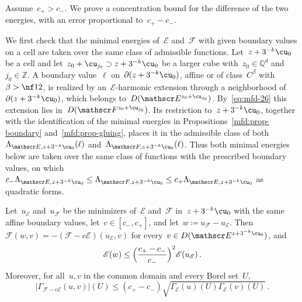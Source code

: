 \documentclass[11pt]{amsart}
\begin{document}
Assume~$c_+>c_-$. We prove a concentration bound for the difference of the two energies, with an error proportional to~$c_+-c_-$.

\smallskip

We first check that the minimal energies of~$\mathscr E$ and~$\mathscr F$ with given boundary values on a cell are taken over the same class of admissible functions. Let~$z+3^{-k}\cu_0$ be a cell and let~$z_0+\cu_{j_0}\supset z+3^{-k}\cu_0$ be a larger cube with~$z_0\in\mathbb Q^d$ and~$j_0\in\mathbb Z$. A boundary value~$\ell$ on~$\partial(z+3^{-k}\cu_0)$, affine or of class~$C^\beta$ with~$\beta>\nf12$, is realized by an~$\mathscr E$-harmonic extension through a neighborhood of~$\partial(z+3^{-k}\cu_0)$, which belongs to~$D(\mathscr E^{z_0+\cu_{j_0}})$. By~\eqref{eq:mfd-26} this extension lies in~$D(\mathscr F^{z_0+\cu_{j_0}})$. Its restriction to~$z+3^{-k}\cu_0$, together with the identification of the minimal energies in Propositions~\ref{mfd:prop-boundary} and~\ref{mfd:prop-gluing}, places it in the admissible class of both~$\Lambda_{\mathscr E,z+3^{-k}\cu_0}(\ell)$ and~$\Lambda_{\mathscr F,z+3^{-k}\cu_0}(\ell)$. Thus both minimal energies below are taken over the same class of functions with the prescribed boundary values, on which~$c_-\Lambda_{\mathscr E,z+3^{-k}\cu_0}\leq\Lambda_{\mathscr F,z+3^{-k}\cu_0}\leq c_+\Lambda_{\mathscr E,z+3^{-k}\cu_0}$ as quadratic forms.

\begin{lemma}
\label{mfd:lem-diff}
Let~$u_{\mathscr E}$ and~$u_{\mathscr F}$ be the minimizers of~$\mathscr E$ and~$\mathscr F$ in~$z+3^{-k}\cu_0$ with the same affine boundary values, let~$c\in[c_-,c_+]$, and let~$w\coloneqq u_{\mathscr F}-u_{\mathscr E}$. Then~$\mathscr F(w,v)=-(\mathscr F-c\mathscr E)(u_{\mathscr E},v)$ for every~$v\in D(\mathscr E^{z+3^{-k}\cu_0})$, and
\begin{equation}
	\mathscr E(w)\leq\Bigl(\frac{c_+-c_-}{c_-}\Bigr)^2\mathscr E(u_{\mathscr E})\,.
	\label{eq:mfd-27}
\end{equation}
Moreover, for all~$u,v$ in the common domain and every Borel set~$U$,
\begin{equation*}
	|\Gamma_{\mathscr F-c\mathscr E}(u,v)|(U)\leq(c_+-c_-)\sqrt{\Gamma_{\mathscr E}(u)(U)\Gamma_{\mathscr E}(v)(U)}\,.
\end{equation*}
\end{lemma}
\end{document}
